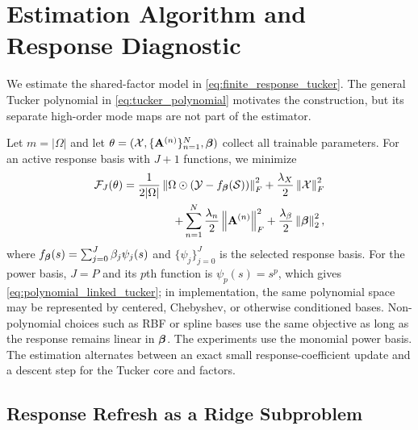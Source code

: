 \section{Estimation Algorithm and Response Diagnostic}
\label{sec:estimation}

We estimate the shared-factor model in
\eqref{eq:finite_response_tucker}. The general Tucker polynomial in
\eqref{eq:tucker_polynomial} motivates the construction, but its separate
high-order mode maps are not part of the estimator.

Let $m=|\Omega|$ and let
$\theta=(\mathcal{X},\{\mathbf{A}^{(n)}\}_{n=1}^{N},\boldsymbol{\beta})$ collect all trainable
parameters. For an active response basis with $J+1$ functions, we minimize
\begin{equation}
\begin{aligned}
  \mathcal{F}_J(\theta)
  =
  \frac{1}{2|\Omega|}
  \left\lVert \Omega \odot \left(\mathcal{Y} - f_{\boldsymbol{\beta}}(\mathcal{S})\right) \right\rVert_F^2
  +
  \frac{\lambda_X}{2}\left\lVert \mathcal{X} \right\rVert_F^2 \\
  \quad
  +
  \sum_{n=1}^{N}\frac{\lambda_n}{2}\left\lVert \mathbf{A}^{(n)} \right\rVert_F^2
  +
  \frac{\lambda_\beta}{2}\left\lVert \boldsymbol{\beta} \right\rVert_2^2,
\end{aligned}
  \label{eq:estimation_objective}
\end{equation}
where $f_{\boldsymbol{\beta}}(s)=\sum_{j=0}^{J}\beta_j\psi_j(s)$ and
$\{\psi_j\}_{j=0}^{J}$ is the selected response basis. For the power basis,
$J=P$ and its $p$th function is $\psi_p(s)=s^p$, which gives
\eqref{eq:polynomial_linked_tucker}; in
implementation, the same polynomial space may be represented by centered,
Chebyshev, or otherwise conditioned bases. Non-polynomial choices such as RBF
or spline bases use the same objective as long as the response remains linear
in $\boldsymbol{\beta}$. The experiments use the monomial power basis. The
estimation alternates between an exact small response-coefficient update and a
descent step for the Tucker core and factors.

\subsection{Response Refresh as a Ridge Subproblem}

